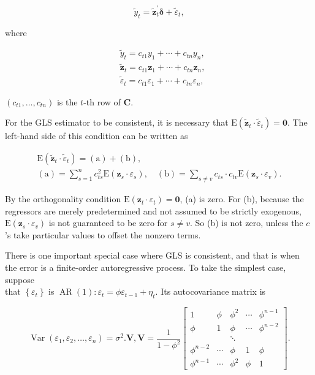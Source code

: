 \documentclass[10pt]{article}
\begin{document}
\begin{equation*}
\tilde{y}_{t}=\tilde{\mathbf{z}}_{t}^{\prime} \boldsymbol{\delta}+\tilde{\varepsilon}_{t}, \tag{6.7.12}
\end{equation*}


where

$$
\begin{aligned}
& \tilde{y}_{t}=c_{t 1} y_{1}+\cdots+c_{t n} y_{n}, \\
& \tilde{\mathbf{z}}_{t}=c_{t 1} \mathbf{z}_{1}+\cdots+c_{t n} \mathbf{z}_{n}, \\
& \tilde{\varepsilon}_{t}=c_{t 1} \varepsilon_{1}+\cdots+c_{t n} \varepsilon_{n},
\end{aligned}
$$

$\left(c_{t 1}, \ldots, c_{t n}\right)$ is the $t$-th row of $\mathbf{C}$.

For the GLS estimator to be consistent, it is necessary that $\mathrm{E}\left(\tilde{\mathbf{z}}_{t} \cdot \tilde{\varepsilon}_{t}\right)=\mathbf{0}$. The left-hand side of this condition can be written as

$$
\begin{gathered}
\mathrm{E}\left(\tilde{\mathbf{z}}_{t} \cdot \tilde{\varepsilon}_{t}\right)=(\mathrm{a})+(\mathrm{b}), \\
(\mathrm{a})=\sum_{s=1}^{n} c_{t s}^{2} \mathrm{E}\left(\mathbf{z}_{s} \cdot \varepsilon_{s}\right), \quad(\mathrm{b})=\sum_{s \neq v} c_{t s} \cdot c_{t v} \mathrm{E}\left(\mathbf{z}_{s} \cdot \varepsilon_{v}\right) .
\end{gathered}
$$

By the orthogonality condition $\mathrm{E}\left(\mathbf{z}_{t} \cdot \varepsilon_{t}\right)=\mathbf{0}$, (a) is zero. For (b), because the regressors are merely predetermined and not assumed to be strictly exogenous, $\mathrm{E}\left(\mathbf{z}_{s} \cdot \varepsilon_{v}\right)$ is not guaranteed to be zero for $s \neq v$. So (b) is not zero, unless the $c$ 's take particular values to offset the nonzero terms.

There is one important special case where GLS is consistent, and that is when the error is a finite-order autoregressive process. To take the simplest case, suppose\\
that $\left\{\varepsilon_{t}\right\}$ is $\operatorname{AR}(1): \varepsilon_{t}=\phi \varepsilon_{t-1}+\eta_{t}$. Its autocovariance matrix is

$$
\operatorname{Var}\left(\varepsilon_{1}, \varepsilon_{2}, \ldots, \varepsilon_{n}\right)=\sigma^{2} . \mathbf{V}, \mathbf{V}=\frac{1}{1-\phi^{2}}\left[\begin{array}{ccccc}
1 & \phi & \phi^{2} & \cdots & \phi^{n-1} \\
\phi & 1 & \phi & \cdots & \phi^{n-2} \\
& & \ddots & & \\
\phi^{n-2} & \cdots & \phi & 1 & \phi \\
\phi^{n-1} & \cdots & \phi^{2} & \phi & 1
\end{array}\right] .
$$
\end{document}
